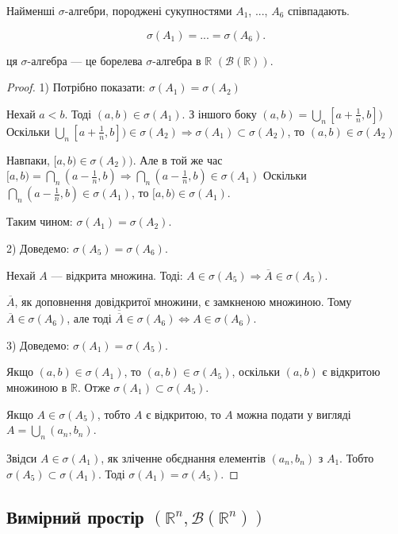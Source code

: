 \begin{theorem}
    Найменші $\sigma$-алгебри, породжені сукупностями $A_1$, ..., $A_6$
    співпадають.

    $$\sigma(A_1) = ... = \sigma(A_6).$$
    
    ця $\sigma$-алгебра --- це борелева $\sigma$-алгебра в $\mathbb{R}$ $(\mathcal{B}(\mathbb{R}))$.
\end{theorem}
\begin{proof}
    1) Потрібно показати: $\sigma(A_1) = \sigma(A_2)$
    
    Нехай $a < b$. Тоді $(a, b) \in \sigma(A_1)$. З іншого боку
    $(a, b) = \bigcup\limits_n [a + \frac{1}{n}, b])$
    Оскільки $\bigcup\limits_n [a + \frac{1}{n}, b]) \in \sigma(A_2)
    \Rightarrow \sigma(A_1) \subset \sigma(A_2)$,
    то $(a, b) \in \sigma(A_2)$
    
    Навпаки, $[a, b) \in \sigma(A_2))$. Але в той же час
    $[a, b) = \bigcap\limits_n (a - \frac{1}{n}, b) \Rightarrow
    \bigcap\limits_n (a - \frac{1}{n}, b) \in \sigma(A_1)$
    Оскільки $\bigcap\limits_n (a - \frac{1}{n}, b) \in \sigma(A_1)$, то
    $[a, b) \in \sigma(A_1)$.
    
    Таким чином: $\sigma(A_1) = \sigma(A_2)$.

    2) Доведемо: $\sigma(A_5) = \sigma(A_6)$.
    
    Нехай $A$ --- відкрита множина. Тоді: 
    $A \in \sigma(A_5) \Rightarrow \overline{A} \in \sigma(A_5).$

    $\overline{A}$, як доповнення довідкритої множини, є замкненою
    множиною. Тому $\overline{A} \in \sigma(A_6)$, але тоді 
    $\overline{\overline{A}} \in \sigma(A_6) \Leftrightarrow A \in \sigma(A_6).$

    3) Доведемо: $\sigma(A_1) = \sigma(A_5)$.
    
    Якщо $(a, b) \in \sigma(A_1)$, то $(a, b) \in \sigma(A_5)$,
    оскільки $(a, b)$ є відкритою множиною в $\mathbb{R}$. 
    Отже $\sigma(A_1) \subset \sigma(A_5)$.
    
    Якщо $A \in \sigma(A_5)$, тобто $A$ є відкритою, то $A$ можна
    подати у вигляді $A = \bigcup_n (a_n, b_n)$.

    Звідси $A \in \sigma(A_1)$, як зліченне обєднання елементів
    $(a_n, b_n)$ з $A_1$. 
    Тобто $\sigma(A_5) \subset \sigma(A_1)$.
    Тоді $\sigma(A_1) = \sigma(A_5)$.
\end{proof}

\subsection[Вимірний простір]{Вимірний простір $(\mathbb{R}^n, \mathcal{B}(\mathbb{R}^n))$}

